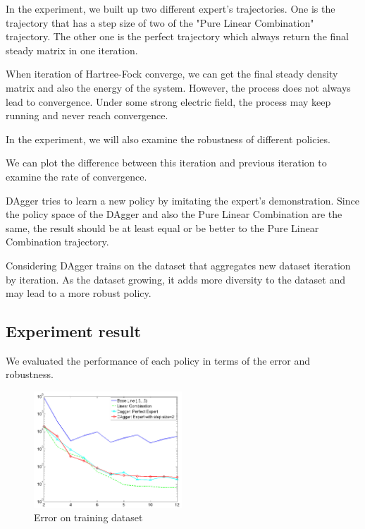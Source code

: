 \documentclass[twoside]{article}
\begin{document}
In the experiment, we built up two different expert's trajectories. 
One is the trajectory that has a step size of two of the "Pure Linear Combination" trajectory. The other one is the perfect trajectory which always return the final steady matrix in one iteration.


When iteration of Hartree-Fock converge, we can get the final steady density matrix and also the energy of the system. However, the process does not always lead to convergence. Under some strong electric field, the process may keep running and never reach convergence.

 In the experiment, we will also examine the robustness of different policies.


We can plot the difference between this iteration and previous iteration to examine the rate of convergence.


DAgger tries to learn a new policy by imitating the expert's demonstration. Since the policy space of the DAgger and also the Pure Linear Combination are the same, the result should be at least equal or be better to the Pure Linear Combination trajectory. 
 
Considering DAgger trains on the dataset that aggregates new dataset iteration by iteration. As the dataset growing, it adds more diversity to the dataset and may lead to a more robust policy.

\subsection{Experiment result}


We evaluated the performance of each policy in terms of the error and robustness. 

\begin{figure}[h!]
  \caption{Error on training dataset}
	\label{fig:training}
    \includegraphics[width=210px]{Dagger_beta05_training.jpg}
\end{figure}
\end{document}
